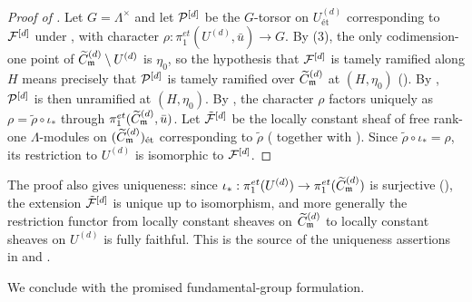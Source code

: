 \begin{proof}[Proof of ]
    Let $G = \Lambda^\times$ and let $\mathcal{P}^{[d]}$ be the $G$-torsor on $U^{(d)}_{\text{\'et}}$
    corresponding to $\mathcal{F}^{[d]}$ under , with character
    $\rho : \pi_1^{et}(U^{(d)}, \bar{u}) \to G$.
    By (3), the only codimension-one point of
    $\widetilde{C}_{\mathfrak{m}}^{(d)} \setminus U^{(d)}$ is $\eta_0$, so the hypothesis that $\mathcal{F}^{[d]}$ is tamely ramified
    along $H$ means precisely that $\mathcal{P}^{[d]}$ is tamely ramified over $\widetilde{C}_{\mathfrak{m}}^{(d)}$ at $(H, \eta_0)$
    ().
    By , $\mathcal{P}^{[d]}$ is then unramified at
    $(H, \eta_0)$. By , the character $\rho$ factors uniquely as
    $\rho = \tilde{\rho} \circ \iota_*$ through
    $\pi_1^{et}(\widetilde{C}_{\mathfrak{m}}^{(d)}, \bar{u})$. Let $\tilde{\mathcal{F}}^{[d]}$ be the locally constant sheaf of free
    rank-one $\Lambda$-modules on $(\widetilde{C}_{\mathfrak{m}}^{(d)})_{\text{\'et}}$ corresponding to $\tilde{\rho}$
    ( together with
    ). Since $\tilde{\rho} \circ \iota_* = \rho$, its restriction
    to $U^{(d)}$ is isomorphic to $\mathcal{F}^{[d]}$.
\end{proof}

\begin{rem*}
    The proof also gives uniqueness: since
    $\iota_* : \pi_1^{et}(U^{(d)}) \to \pi_1^{et}(\widetilde{C}_{\mathfrak{m}}^{(d)})$ is surjective
    (), the extension $\tilde{\mathcal{F}}^{[d]}$ is unique up to
    isomorphism, and more generally the restriction functor from locally constant sheaves on
    $\widetilde{C}_{\mathfrak{m}}^{(d)}$ to locally constant sheaves on $U^{(d)}$ is fully faithful. This is the source
    of the uniqueness assertions in  and .
\end{rem*}

We conclude with the promised fundamental-group formulation.

